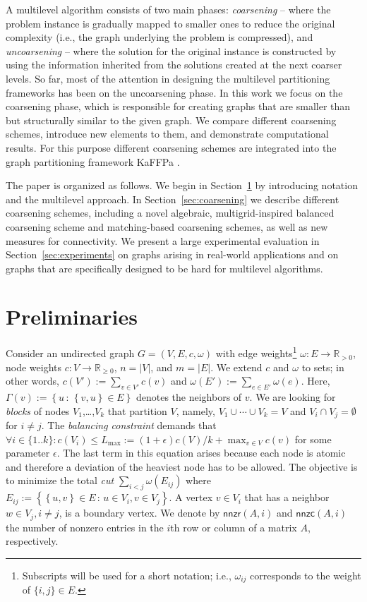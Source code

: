 \documentclass{llncs}
\newcommand{\set}[1]{\left\{ #1\right\}}
\newcommand{\gilt}{:}
\newcommand{\sodass}{\,:\,}
\newcommand{\setGilt}[2]{\left\{ #1\sodass #2\right\}}
\newcommand{\Is}       {:=}
\newcommand{\nnzr}{\textsf{nnzr}}
\newcommand{\nnzc}{\textsf{nnzc}}
\def\MdR{\ensuremath{\mathbb{R}}}
\begin{document}
A multilevel algorithm consists of two main phases: \emph{coarsening} -- where the problem instance is  gradually mapped to smaller ones to reduce the original complexity (i.e., the graph underlying the problem is compressed), 
and \emph{uncoarsening} -- where the solution for the original instance is constructed by using the information inherited from the solutions created at the next coarser levels. 
 So far, most of the attention in designing the multilevel partitioning frameworks has been on the uncoarsening phase. In this work we focus on the coarsening phase, which is responsible for creating  graphs that are smaller than but structurally similar to the given graph. We compare different coarsening schemes, introduce new elements to them, and demonstrate computational results. For this purpose different coarsening schemes are integrated into the graph partitioning framework KaFFPa \cite{kaffpa}.

The paper is organized as follows. We begin in Section~\ref{sec:preliminaries} by introducing notation  and the multilevel approach. 
In Section~\ref{sec:coarsening} we describe different coarsening schemes, including a novel algebraic, multigrid-inspired balanced coarsening scheme and matching-based coarsening schemes, as well as new measures for connectivity. 
We present a large experimental evaluation in Section~\ref{sec:experiments} on graphs arising in real-world applications and on graphs that are specifically designed to be hard for multilevel algorithms.

\section{Preliminaries}
\label{sec:preliminaries}
Consider an undirected graph $G=(V,E,c,\omega)$
with edge weights\footnote{Subscripts will be used for a short notation; i.e., $\omega_{ij}$ corresponds to the weight of $\{i,j\}\in E$.} $\omega: E \to \MdR_{>0}$, node weights
$c: V \to \MdR_{\geq 0}$, $n = |V|$, and $m = |E|$.
We extend $c$ and $\omega$ to sets; in other words,
$c(V')\Is \sum_{v\in V'}c(v)$ and $\omega(E')\Is \sum_{e\in E'}\omega(e)$.
Here, $\Gamma(v)\Is \setGilt{u}{\set{v,u}\in E}$ denotes the neighbors of $v$.
We are looking for \emph{blocks} of nodes $V_1$,\ldots,$V_k$
that partition $V$, namely, $V_1\cup\cdots\cup V_k=V$ and $V_i\cap V_j=\emptyset$
for $i\neq j$. The \emph{balancing constraint} demands that
$\forall i\in \{1..k\}\gilt c(V_i)\leq L_{\max}\Is (1+\epsilon)c(V)/k+\max_{v\in V} c(v)$ for
some parameter $\epsilon$.
The last term in this equation arises because each node is atomic and
therefore a deviation of the heaviest node has to be allowed.
The objective is to minimize the total \emph{cut} $\sum_{i<j}\omega (E_{ij})$ where
$E_{ij}\Is\setGilt{\set{u,v}\in E}{u\in V_i,v\in V_j}$.
A vertex $v \in V_i$ that has a neighbor $w \in V_j, i\neq j$, is a boundary vertex.
We denote by $\nnzr(A,i)$ and $\nnzc(A,i)$ the number of nonzero entries in the $i$th row or column of a matrix $A$, respectively.
\end{document}

